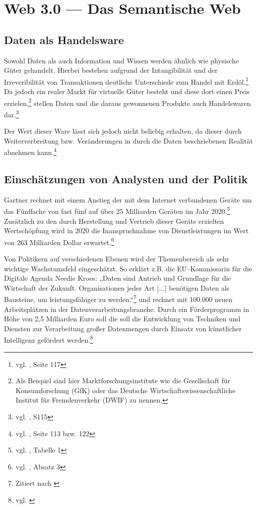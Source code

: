 \section{Web 3.0 --- Das Semantische Web}
\label{sec:hauptteil}

\subsection{Daten als Handelsware}
\label{handelsware}

Sowohl Daten als auch Information und Wissen werden ähnlich wie physische Güter gehandelt. Hierbei bestehen aufgrund der Intangibilität und der Irreveribilität von Transaktionen deutliche Unterschiede zum Handel mit Erdöl.\footnote{vgl. \cite{wiener}, Seite 117} Da jedoch ein realer Markt für virtuelle Güter besteht und diese dort einen Preis erzielen,\footnote{Als Beispiel sind hier Marktforschungsinstitute wie die Gesellschaft für Konsumforschung (GfK) oder das Deutsche Wirtschaftswissenschaftliche Institut für Fremdenverkehr (DWIF) zu nennen.} stellen Daten und die daraus gewonnenen Produkte auch Handelswaren dar.\footnote{vgl. \cite{wiener}, S115}

Der Wert dieser Ware lässt sich jedoch nicht beliebig erhalten, da dieser durch Weiterverbreitung bzw. Veränderungen in durch die Daten beschriebenen Realität abnehmen kann.\footnote{vgl. \cite{wiener}, Seite 113 bzw. 122}

\subsection{Einschätzungen von Analysten und der Politik}
\label{politik}

Gartner rechnet mit einem Anstieg der mit dem Internet verbundenen Geräte um das Fünffache  von fast fünf auf über 25 Milliarden Geräten im Jahr 2020.\footnote{vgl. \cite{gartneriot}, Tabelle 1} Zusätzlich zu den durch Herstellung und Vertrieb dieser Geräte erzielten Wertschöpfung wird in 2020 die Inanspruchnahme von Dienstleistungen im Wert von 263 Milliarden Dollar erwartet.\footnote{vgl. \cite{gartneriot}, Absatz 3}

Von Politikern auf verschiedenen Ebenen wird der Themenbereich  als sehr wichtige Wachstumsfeld eingeschätzt. So erklärt z.B. die EU--Kommissarin für die Digitale Agenda Needie Kroes: „Daten sind Antrieb und Grundlage für die Wirtschaft der Zukunft. Organisationen jeder Art [...] benötigen Daten als Bausteine, um leistungsfähiger zu werden.“\footnote{Zitiert nach \cite{bd25}} und rechnet mit 100.000 neuen Arbeitsplätzen in der Datenverarbeitungsbranche. Durch ein Förderprogramm in Höhe von 2,5 Milliarden Euro soll die soll die Entwicklung von Techniken und Diensten zur Verarbeitung großer Datenmengen durch Einsatz von künstlicher Intelligenz gefördert werden.\footnote{vgl. \cite{bd25}}

